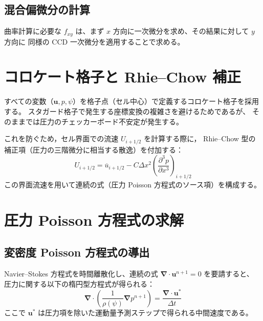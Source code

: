 \documentclass[12pt, a4paper, titlepage, xelatex, ja=standard]{bxjsarticle}
\newcommand{\bu}{\bm{u}}
\newcommand{\bnabla}{\bm{\nabla}}
\begin{document}
\subsection{混合偏微分の計算}

曲率計算に必要な $f_{xy}$ は、まず $x$ 方向に一次微分を求め、その結果に対して $y$ 方向に
同様の CCD 一次微分を適用することで求める。


\section{コロケート格子と Rhie--Chow 補正}
\label{sec:collocate}

すべての変数（$\bu, p, \psi$）を格子点（セル中心）で定義するコロケート格子を採用する。
スタガード格子で発生する座標変換の複雑さを避けるためであるが、
そのままでは圧力のチェッカーボード不安定が発生する。

これを防ぐため，セル界面での流速 $U_{i+1/2}$ を計算する際に，
Rhie--Chow 型の補正項（圧力の三階微分に相当する散逸）を付加する：
\begin{equation}
  U_{i+1/2} = \overline{u}_{i+1/2} - C \Delta x^2 \left( \frac{\partial^3 p}{\partial x^3} \right)_{i+1/2}
\end{equation}
この界面流速を用いて連続の式（圧力 Poisson 方程式のソース項）を構成する。


\section{圧力 Poisson 方程式の求解}
\label{sec:pressure}

\subsection{変密度 Poisson 方程式の導出}

Navier--Stokes 方程式を時間離散化し、連続の式 $\bnabla \cdot \bu^{n+1} = 0$ を要請すると、
圧力に関する以下の楕円型方程式が得られる：
\begin{equation}
  \bnabla \cdot \left( \frac{1}{\rho(\psi)} \bnabla p^{n+1} \right) = \frac{\bnabla \cdot \bu^*}{\Delta t}
\end{equation}
ここで $\bu^*$ は圧力項を除いた運動量予測ステップで得られる中間速度である。
\end{document}
